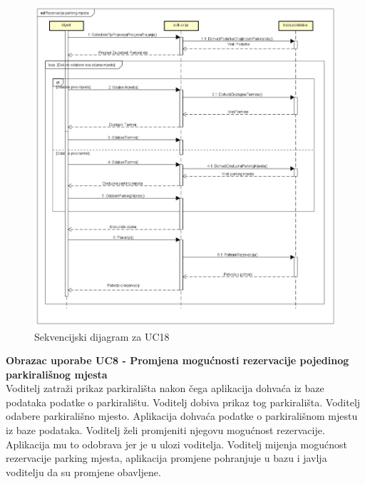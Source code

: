 \begin{packed_item}
			 	\begin{figure}[H]
					\includegraphics[width=\textwidth]{slike/RezervacijaParkingMjesta.png} %
					\caption{Sekvencijski dijagram za UC18}
					\label{fig:rezarvacija}
				\end{figure}
				\eject	
				
				\textbf{Obrazac uporabe UC8 - Promjena mogućnosti rezervacije pojedinog parkirališnog mjesta}\\
				
				Voditelj zatraži prikaz parkirališta nakon čega aplikacija dohvaća iz baze podataka podatke o parkiralištu. Voditelj dobiva prikaz tog parkirališta. Voditelj odabere parkirališno mjesto. Aplikacija dohvaća podatke o parkirališnom mjestu iz baze podataka. Voditelj želi promjeniti njegovu mogućnost rezervacije. Aplikacija mu to odobrava jer je u ulozi voditelja. Voditelj mijenja mogućnost rezervacije parking mjesta, aplikacija promjene pohranjuje u bazu i javlja voditelju da su promjene obavljene. 
				

\end{packed_item}
